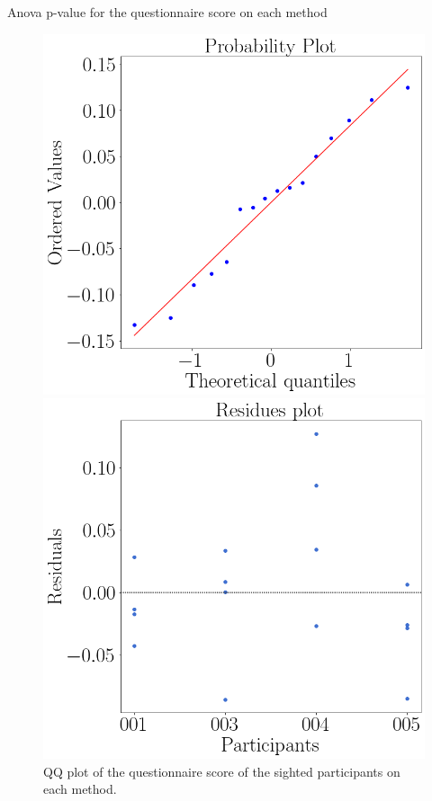 \begin{table}
    \caption{Anova p-value for the questionnaire score on each method}
    \label{tab:blocanova_questionnaire_blind_sight}
\begin{minipage}{0.45\textwidth}
    
\end{minipage}
\begin{minipage}{0.45\textwidth}
    
\end{minipage}
\end{table}

\begin{figure}[!htb]
    \centering
    \begin{minipage}{0.45\textwidth}
        \centering
        \includegraphics[width = 0.8\linewidth]{Resultados/Questionario/Figuras/png/qqplot_questionnaires_sight.png}
        \caption{QQ plot of the questionnaire score of the sighted participants on each method.}
        \label{fig:qqplot_questionnaires_sight}
    \end{minipage}
    \begin{minipage}{0.45\textwidth}
        \centering
        \includegraphics[width = 0.8\linewidth]{Resultados/Questionario/Figuras/png/residplot_questionnaires_sight.png}

\end{minipage}
\end{figure}
